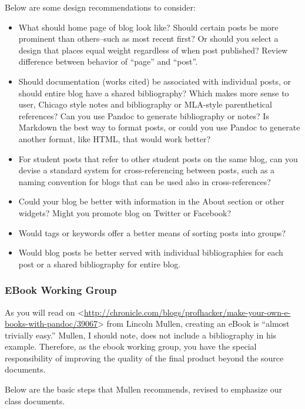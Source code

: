 \documentclass[]{article}
\begin{document}
Below are some design recommendations to consider:

\begin{itemize}
\itemsep1pt\parskip0pt
\item
  What should home page of blog look like? Should certain posts be more
  prominent than others--such as most recent first? Or should you select
  a design that places equal weight regardless of when post published?
  Review difference between behavior of ``page'' and ``post''.
\item
  Should documentation (works cited) be associated with individual
  posts, or should entire blog have a shared bibliography? Which makes
  more sense to user, Chicago style notes and bibliography or MLA-style
  parenthetical references? Can you use Pandoc to generate bibliography
  or notes? Is Markdown the best way to format posts, or could you use
  Pandoc to generate another format, like HTML, that would work better?
\item
  For student posts that refer to other student posts on the same blog,
  can you devise a standard system for cross-referencing between posts,
  such as a naming convention for blogs that can be used also in
  cross-references?
\item
  Could your blog be better with information in the About section or
  other widgets? Might you promote blog on Twitter or Facebook?
\item
  Would tags or keywords offer a better means of sorting posts into
  groups?
\item
  Would blog posts be better served with individual bibliographies for
  each post or a shared bibliography for entire blog.
\end{itemize}

\subsubsection{EBook Working Group}\label{ebook-working-group}

As you will read on
\textless{}\url{http://chronicle.com/blogs/profhacker/make-your-own-e-books-with-pandoc/39067}\textgreater{}
from Lincoln Mullen, creating an eBook is ``almost trivially easy.''
Mullen, I should note, does not include a bibliography in his example.
Therefore, as the ebook working group, you have the special
responsibility of improving the quality of the final product beyond the
source documents.

Below are the basic steps that Mullen recommends, revised to emphasize
our class documents.
\end{document}
